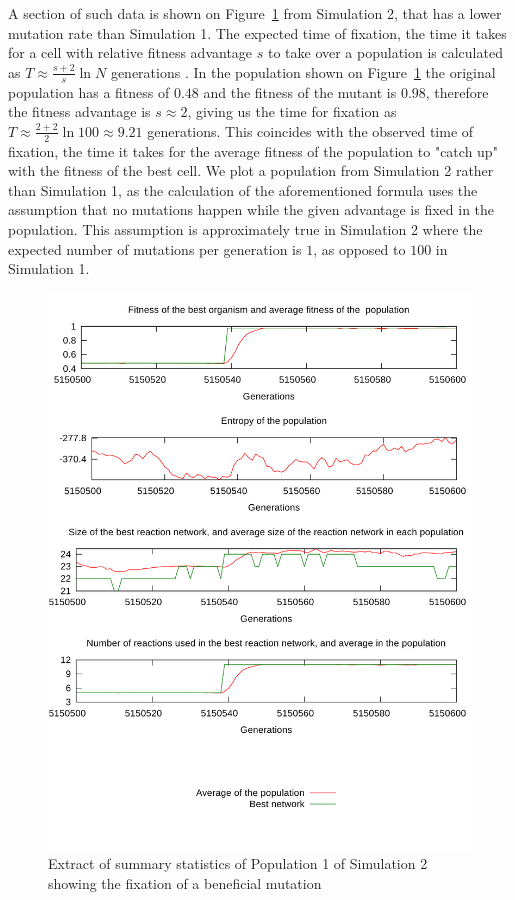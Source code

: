 \documentclass[a4paper,12pt]{article}
\begin{document}
A section of such data is shown on Figure~\ref{fig:fixation} from Simulation 2, that has a lower mutation rate than Simulation 1. The expected time of fixation, the time it takes for a cell with relative fitness advantage $s$ to take over a population is calculated as $T \approx \frac{s+2}{s}\ln N$ generations \cite{barteklecture}. In the population shown on Figure~\ref{fig:fixation} the original population has a fitness of $0.48$ and the fitness of the mutant is $0.98$, therefore the fitness advantage is $s\approx2$, giving us the time for fixation as $T\approx \frac{2+2}{2}\ln 100 \approx 9.21$ generations. This coincides with the observed time of fixation, the time it takes for the average fitness of the population to "catch up" with the fitness of the best cell. We plot a population from Simulation 2 rather than Simulation 1, as the calculation of the aforementioned formula uses the assumption that no mutations happen while the given advantage is fixed in the population. This assumption is approximately true in Simulation 2 where the expected number of mutations per generation is $1$, as opposed to $100$ in Simulation 1.

\begin{figure}[htpb]
	\centering
	\includegraphics[width=0.8\linewidth]{fixation.pdf}
	\caption{Extract of summary statistics of Population 1 of Simulation 2 showing the fixation of a beneficial mutation}
	\label{fig:fixation}
\end{figure}
\end{document}
